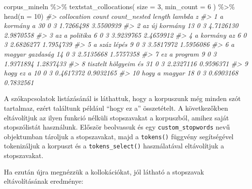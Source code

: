 \documentclass[
]{book}
\newenvironment{Shaded}{\begin{snugshade}}{\end{snugshade}}
\newcommand{\AttributeTok}[1]{\textcolor[rgb]{0.77,0.63,0.00}{#1}}
\newcommand{\CommentTok}[1]{\textcolor[rgb]{0.56,0.35,0.01}{\textit{#1}}}
\newcommand{\DecValTok}[1]{\textcolor[rgb]{0.00,0.00,0.81}{#1}}
\newcommand{\FunctionTok}[1]{\textcolor[rgb]{0.00,0.00,0.00}{#1}}
\newcommand{\NormalTok}[1]{#1}
\newcommand{\SpecialCharTok}[1]{\textcolor[rgb]{0.00,0.00,0.00}{#1}}
\begin{document}
\begin{Shaded}
\begin{Highlighting}[]

\NormalTok{corpus\_mineln }\SpecialCharTok{\%\textgreater{}\%}
  \FunctionTok{textstat\_collocations}\NormalTok{(}
    \AttributeTok{size =} \DecValTok{3}\NormalTok{,}
    \AttributeTok{min\_count =} \DecValTok{6}
\NormalTok{  ) }\SpecialCharTok{\%\textgreater{}\%}
  \FunctionTok{head}\NormalTok{(}\AttributeTok{n =} \DecValTok{10}\NormalTok{)}
\CommentTok{\#\textgreater{}             collocation count count\_nested length    lambda         z}
\CommentTok{\#\textgreater{} 1           a kormány a    30            0      3 1.7266498 3.5500939}
\CommentTok{\#\textgreater{} 2         az új kormány    13            0      3 4.7126130 2.9870558}
\CommentTok{\#\textgreater{} 3         az a politika     6            0      3 3.9239765 2.4659912}
\CommentTok{\#\textgreater{} 4          a kormány az     6            0      3 2.6826277 1.7954739}
\CommentTok{\#\textgreater{} 5          a száz lépés     9            0      3 3.5817972 1.5956086}
\CommentTok{\#\textgreater{} 6     a magyar gazdaság    14            0      3 2.5135668 1.5757358}
\CommentTok{\#\textgreater{} 7          ez a program     9            0      3 1.9371894 1.2837433}
\CommentTok{\#\textgreater{} 8  tisztelt hölgyeim és    31            0      3 2.2327116 0.9596371}
\CommentTok{\#\textgreater{} 9             hogy ez a    10            0      3 0.4617372 0.9032165}
\CommentTok{\#\textgreater{} 10        hogy a magyar    18            0      3 0.6903168 0.7832561}
\end{Highlighting}
\end{Shaded}

A szókapcsolatok listázásánál is láthattuk, hogy a korpuszunk még minden
szót tartalmaz, ezért találtunk például ``hogy ez a'' összetételt. A
következőkben eltávolítjuk az ilyen funkció nélküli stopszavakat a
korpuszból, amihez saját stopszólistát használunk. Először beolvassuk és
egy \texttt{custom\_stopwords} nevű objektumban tároljuk a stopszavakat,
majd a \texttt{tokens()} függvény segítségével tokenizáljuk a korpuszt
és a \texttt{tokens\_select()} használatával eltávolítjuk a
stopszavakat.

Ha ezután újra megnézzük a kollokációkat, jól látható a stopszavak
eltávolításának eredménye:
\end{document}
